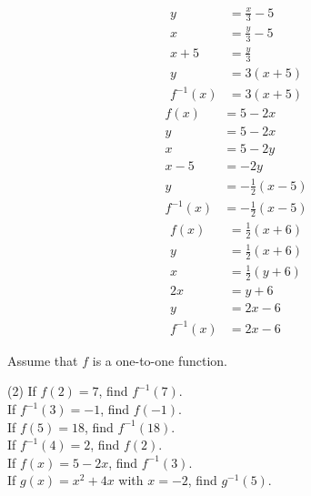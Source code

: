 \documentclass[12pt,fleqn]{book}
\newcommand{\prb}[1]{\begin{Exercise}#1\end{Exercise}}
\begin{document}
{\begin{tasks}
\begin{align*}
            y         & =\frac{x}{3}-5 \\
            x         & =\frac{y}{3}-5 \\
            x+5       & =\frac{y}{3}   \\
            y         & =3(x+5)        \\
            f^{-1}(x) & =3(x+5)
        \end{align*}
        \task
        \begin{align*}
            f(x)      & =5-2 x             \\
            y         & =5-2 x             \\
            x         & =5-2 y             \\
            x-5       & =-2 y              \\
            y         & =-\frac{1}{2}(x-5) \\
            f^{-1}(x) & =-\frac{1}{2}(x-5)
        \end{align*}
        \task
        \begin{align*}
            f(x)      & =\frac{1}{2}(x+6) \\
            y         & =\frac{1}{2}(x+6) \\
            x         & =\frac{1}{2}(y+6) \\
            2 x       & =y+6              \\
            y         & =2 x-6            \\
            f^{-1}(x) & =2 x-6
        \end{align*}
    \end{tasks}
}
\clearpage
\prb{Assume that $f$ is a one-to-one function.
    \begin{tasks}(2)
        \task If $f(2)=7$, find $f^{-1}(7)$.
        \\[2in]
        \task If $f^{-1}(3)=-1$, find $f(-1)$.
        \\[2in]
        \task If $f(5)=18$, find $f^{-1}(18)$.
        \\[2in]
        \task If $f^{-1}(4)=2$, find $f(2)$.
        \\[2in]
        \task If $f(x)=5-2 x$, find $f^{-1}(3)$.
        \\[2in]
        \task If $g(x)=x^2+4 x$ with $x=-2$, find $g^{-1}(5)$.
        \\[2in]
    \end{tasks}
}
\clearpage
\end{document}

